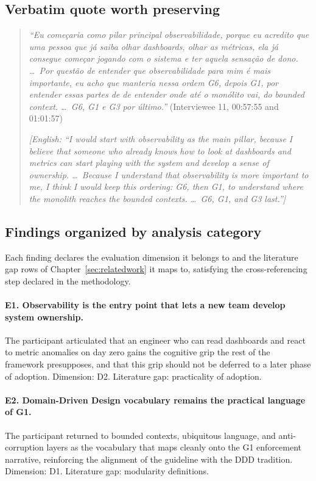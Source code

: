 \subsection*{Verbatim quote worth preserving}

\begin{quote}
\emph{``Eu come\c{c}aria como pilar principal observabilidade, porque eu acredito que uma pessoa que j\'a saiba olhar dashboards, olhar as m\'etricas, ela j\'a consegue come\c{c}ar jogando com o sistema e ter aquela sensa\c{c}\~ao de dono. \ldots\ Por quest\~ao de entender que observabilidade para mim \'e mais importante, eu acho que manteria nessa ordem G6, depois G1, por entender essas partes de de entender onde at\'e o mon\'olito vai, do bounded context. \ldots\ G6, G1 e G3 por \'ultimo.''} (Interviewee 11, 00:57:55 and 01:01:57)

\emph{[English: ``I would start with observability as the main pillar, because I believe that someone who already knows how to look at dashboards and metrics can start playing with the system and develop a sense of ownership. \ldots\ Because I understand that observability is more important to me, I think I would keep this ordering: G6, then G1, to understand where the monolith reaches the bounded contexts. \ldots\ G6, G1, and G3 last.'']}
\end{quote}

\subsection*{Findings organized by analysis category}

Each finding declares the evaluation dimension it belongs to and the literature gap rows of Chapter~\ref{sec:relatedwork} it maps to, satisfying the cross-referencing step declared in the methodology.

\paragraph*{E1. Observability is the entry point that lets a new team develop system ownership.} The participant articulated that an engineer who can read dashboards and react to metric anomalies on day zero gains the cognitive grip the rest of the framework presupposes, and that this grip should not be deferred to a later phase of adoption. Dimension: D2. Literature gap: practicality of adoption.

\paragraph*{E2. Domain-Driven Design vocabulary remains the practical language of G1.} The participant returned to bounded contexts, ubiquitous language, and anti-corruption layers as the vocabulary that maps cleanly onto the G1 enforcement narrative, reinforcing the alignment of the guideline with the DDD tradition. Dimension: D1. Literature gap: modularity definitions.

